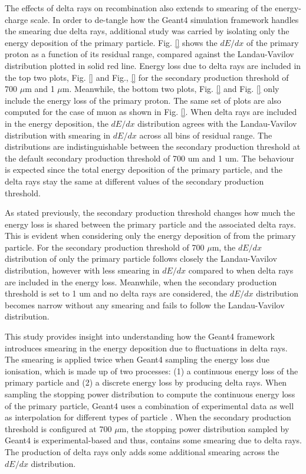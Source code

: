 The effects of delta rays on recombination also extends to smearing of the energy-charge scale.
In order to de-tangle how the Geant4 simulation framework handles the smearing due delta rays, additional study was carried by isolating only the energy deposition of the primary particle.
Fig. \ref{} shows the $dE/dx$ of the primary proton as a function of its residual range, compared against the Landau-Vavilov distribution \cite{} plotted in solid red line.
Energy loss due to delta rays are included in the top two plots, Fig. \ref{} and Fig., \ref{} for the secondary production threshold of 700 $\mu$m and 1 $\mu$m.
Meanwhile, the bottom two plots, Fig. \ref{} and Fig. \ref{} only include the energy loss of the primary proton.
The same set of plots are also computed for the case of muon as shown in Fig. \ref{}.
When delta rays are included in the energy deposition, the $dE/dx$ distribution agrees with the Landau-Vavilov distribution with smearing in $dE/dx$ across all bins of residual range.
The distributions are indistinguishable between the secondary production threshold at the default secondary production threshold of 700 um and 1 um. 
The behaviour is expected since the total energy deposition of the primary particle, and the delta rays stay the same at different values of the secondary production threshold.

As stated previously, the secondary production threshold changes how much the energy loss is shared between the primary particle and the associated delta rays.
This is evident when considering only the energy deposition of from the primary particle. 
For the secondary production threshold of 700 $\mu$m, the $dE/dx$ distribution of only the primary particle follows closely the Landau-Vavilov distribution, however with less smearing in $dE/dx$ compared to when delta rays are included in the energy loss.
Meanwhile, when the secondary production threshold is set to 1 um and no delta rays are considered, the $dE/dx$ distribution becomes narrow without any smearing and fails to follow the Landau-Vavilov distribution. 

This study provides insight into understanding how the Geant4 framework introduces smearing in the energy deposition due to fluctuations in delta rays.
The smearing is applied twice when Geant4 sampling the energy loss due ionisation, which is made up of two processes: (1) a continuous energy loss of the primary particle and (2) a discrete energy loss by producing delta rays.
When sampling the stopping power distribution to compute the continuous energy loss of the primary particle, Geant4 uses a combination of experimental data as well as interpolation for different types of particle \cite{}. 
When the secondary production threshold is configured at 700 $\mu$m, the stopping power distribution sampled by Geant4 is experimental-based and thus, contains some smearing due to delta rays.
The production of delta rays only adds some additional smearing across the $dE/dx$ distribution. 


